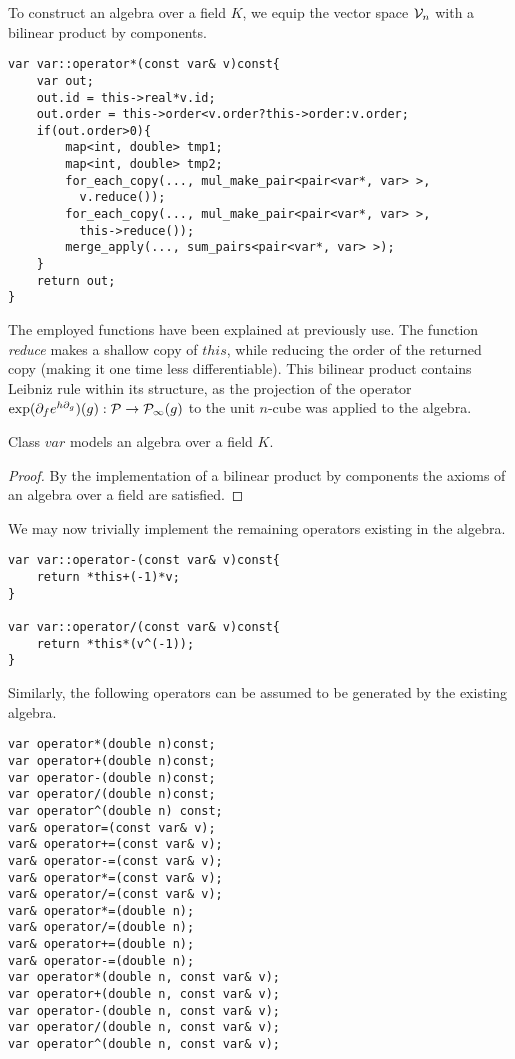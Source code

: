 To construct an algebra over a field $K$, we equip the vector space $\mathcal{V}_n$ with a bilinear product by components.

\begin{lstlisting}
var var::operator*(const var& v)const{
    var out;
    out.id = this->real*v.id;
    out.order = this->order<v.order?this->order:v.order;
    if(out.order>0){
        map<int, double> tmp1;
        map<int, double> tmp2;
        for_each_copy(..., mul_make_pair<pair<var*, var> >, 
          v.reduce());
        for_each_copy(..., mul_make_pair<pair<var*, var> >, 
          this->reduce());
        merge_apply(..., sum_pairs<pair<var*, var> >);
    }
    return out;
}
\end{lstlisting}
The employed functions have been explained at previously use. The function \emph{reduce} makes a shallow copy of $this$, while reducing the order of the returned copy (making it one time less differentiable). This bilinear product contains Leibniz rule within its structure, as the projection of the operator $\exp(\partial_fe^{h\partial_g})(g): \mathcal{P}\to\mathcal{P}_\infty(g)$ to the unit $n$-cube was applied to the algebra.

\begin{theorem}
Class $var$ models an algebra over a field $K$.
\end{theorem}
\begin{proof}
By the implementation of a bilinear product by components the axioms of an algebra over a field are satisfied.
\end{proof}

We may now trivially implement the remaining operators existing in the algebra.

\begin{lstlisting}
var var::operator-(const var& v)const{
    return *this+(-1)*v;
}

var var::operator/(const var& v)const{
    return *this*(v^(-1));
}
\end{lstlisting}
Similarly, the following operators can be assumed to be generated by the existing algebra.

\begin{lstlisting}
var operator*(double n)const;
var operator+(double n)const;
var operator-(double n)const;
var operator/(double n)const;
var operator^(double n) const;
var& operator=(const var& v);
var& operator+=(const var& v);
var& operator-=(const var& v);
var& operator*=(const var& v);
var& operator/=(const var& v);
var& operator*=(double n);
var& operator/=(double n);
var& operator+=(double n);
var& operator-=(double n);
var operator*(double n, const var& v);
var operator+(double n, const var& v);
var operator-(double n, const var& v);
var operator/(double n, const var& v);
var operator^(double n, const var& v);
\end{lstlisting} 

